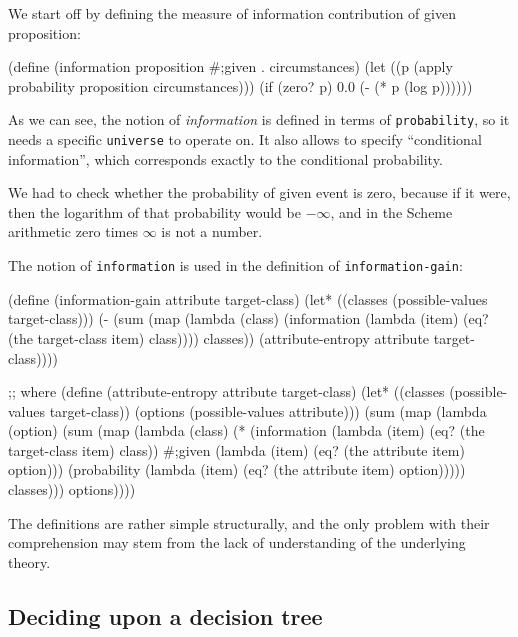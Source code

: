 We start off by defining the measure of information
contribution of given proposition:

\begin{Snippet}
(define (information proposition #;given . circumstances)
  (let ((p (apply probability proposition circumstances)))
    (if (zero? p)
        0.0
        (- (* p (log p))))))
\end{Snippet}

As we can see, the notion of \textit{information} is defined
in terms of \texttt{probability}, so it needs a specific
\texttt{universe} to operate on. It also allows to specify
``conditional information'', which corresponds exactly to
the conditional probability.

We had to check whether the probability of given event is
zero, because if it were, then the logarithm of that probability
would be $-\infty$, and in the Scheme arithmetic zero times
$\infty$ is not a number.

The notion of \texttt{information} is used in the definition
of \texttt{information-gain}:

\begin{Snippet}
(define (information-gain attribute target-class)
  (let* ((classes (possible-values target-class)))
    (- (sum (map (lambda (class)
                   (information (lambda (item)
				  (eq? (the target-class item)
				       class))))
		 classes))
	 (attribute-entropy attribute target-class))))
\end{Snippet}
\begin{Snippet}
;; where
(define (attribute-entropy attribute target-class)
  (let* ((classes (possible-values target-class))
         (options (possible-values attribute)))
    (sum (map (lambda (option)
                (sum (map (lambda (class)
			    (* (information
			        (lambda (item)
                                  (eq? (the target-class item)
				       class))
			        #;given
			        (lambda (item)
                                  (eq? (the attribute item)
				     option)))
			       (probability
			        (lambda (item)
				  (eq? (the attribute item)
				        option)))))
			  classes)))
	      options))))
\end{Snippet}
The definitions are rather simple structurally, and the
only problem with their comprehension may stem from the
lack of understanding of the underlying theory.

\subsection{Deciding upon a decision tree}

